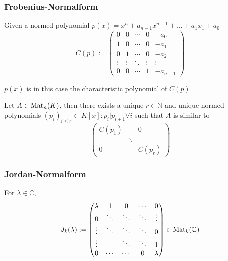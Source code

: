 \subsubsection{Frobenius-Normalform}
\begin{definition}
   Given a normed polynomial \(p(x) = x^n + a_{n-1}x^{n-1} + \ldots + a_1 x_1 + a_0\)
   \[C(p) := \begin{pmatrix}
         0      & 0      & \cdots & 0      & -a_0\\
         1      & 0      & \cdots & 0      & -a_1\\
         0      & 1      & \cdots & 0      & -a_2\\
         \vdots & \vdots & \ddots & \vdots & \vdots\\
         0      & 0      & \cdots & 1      & -a_{n-1}
   \end{pmatrix}\]
\end{definition}
\begin{remark}
   \(p(x)\) is in this case the characteristic polynomial of \(C(p)\).
\end{remark}

\begin{corollary}\label{cor:frobenius}
   Let \(A \in \operatorname{Mat}_n(K)\), then there exists a unique \(r \in \mathbb{N}\) and unique normed polynomials \((p_i)_{i \leq r} \subset K[x]: p_i | p_{i+1} \forall i\) such that \(A\) is similar to
   \[\begin{pmatrix}C(p_1) & & 0\\ & \ddots & \\ 0 & & C(p_r)\end{pmatrix}\]
\end{corollary}

\subsubsection{Jordan-Normalform}
\begin{definition}
   For \(\lambda \in \mathbb{C}\),
   \[J_k(\lambda) := \begin{pmatrix}
         \lambda & 1       & 0      & \cdots  & 0       \\
         0       & \ddots & \ddots &  \ddots & \vdots  \\
         \vdots  & \ddots  & \ddots & \ddots  & 0       \\
         \vdots  &         & \ddots & \ddots & 1       \\
         0       & \cdots  & \cdots & 0       & \lambda \\
   \end{pmatrix} \in \operatorname{Mat}_k(\mathbb{C})\]
\end{definition}

